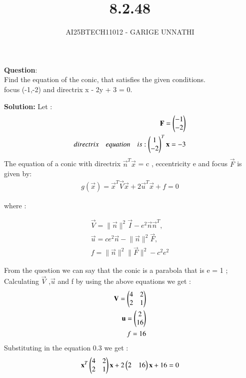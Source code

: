 \documentclass[journal]{IEEEtran}
\begin{document}

\vspace{3cm}

\title{8.2.48}
\author{AI25BTECH11012 - GARIGE UNNATHI}
{\let\newpage\relax\maketitle}


\renewcommand{\thefigure}{\theenumi}
\renewcommand{\thetable}{\theenumi}
\setlength{\intextsep}{10pt} %


\renewcommand{\thetable}{\theenumi}


\textbf{Question}:\\
Find the equation of the conic, that satisfies the given conditions. \\ 
focus (-1,-2) and directrix x - 2y + 3 = 0.
 
\textbf{Solution: }
Let :
\begin{align}
    \mathbf{F} = \begin{pmatrix}-1\\-2\end{pmatrix}\\
    directrix \quad equation \quad is : \begin{pmatrix}1\\-2\end{pmatrix}^{T}\mathbf{x} = -3
\end{align}
The equation of a conic with directrix $\vec{n}^{T}$$\vec{x}$ = c , eccentricity e and focus $\vec{F}$ is given by:
\begin{align}
    g(\vec{x}) = \vec{x}^{T}\vec{V}\vec{x} + 2\vec{u}^{T}\vec{x} + f  = 0
\end{align}

where :

\begin{align*}
\vec{V} = \lVert \vec{n} \rVert^{2}\vec{I} - e^{2}\vec{n}\vec{n}^{T} , \\
\vec{u} = ce^{2}\vec{n} - \lVert \vec{n} \rVert^{2}\vec{F} , \\
f = \lVert \vec{n} \rVert^{2}\lVert \vec{F} \rVert^{2} - c^{2}e^{2}
\end{align*}

From the question we can say that the conic is a parabola that is e = 1 ;\\
Calculating $\vec{V}$ ,$\vec{u}$ and f by using the above equations we get :
\begin{align}
   \mathbf{V} = \begin{pmatrix}4 & 2\\2 & 1\end{pmatrix}\\
   \mathbf{u} = \begin{pmatrix}2\\16\end{pmatrix}\\
   f = 16
\end{align}
Substituting in the equation 0.3 we get :
\begin{align}
  \mathbf{x}^{T}\begin{pmatrix}4 & 2\\2 & 1\end{pmatrix}\mathbf{x} + 2\begin{pmatrix}2 & 16\end{pmatrix}\mathbf{x} +16 =0
\end{align}
\end{document}

